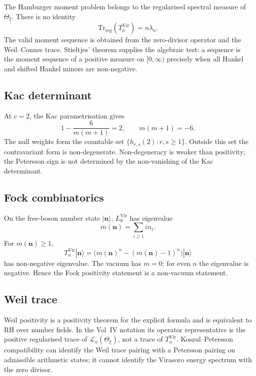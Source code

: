 The Hamburger moment problem belongs to the regularised spectral
measure of \(\Theta_{\xi}\). There is no identity
\[
\mathrm{Tr}_{\mathrm{reg}}(T_{n}^{\mathrm{Vir}})=n\lambda_{n}.
\]
The valid moment sequence is obtained from the zero-divisor operator and the
Weil--Connes trace. Stieltjes' theorem supplies the algebraic test:
a sequence is the moment sequence of a positive measure on
\([0,\infty)\) precisely when all Hankel and shifted Hankel minors are
non-negative.

\subsection{Kac determinant}
\label{v4-arith:vb:cycle:A3}

At \(c=2\), the Kac parametrisation gives
\[
1-\frac{6}{m(m+1)}=2,\qquad m(m+1)=-6.
\]
The null weights form the countable set
\(\{h_{r,s}(2):r,s\geq1\}\). Outside this set the contravariant form
is non-degenerate. Non-degeneracy is weaker than positivity; the
Petersson sign is not determined by the non-vanishing of the Kac
determinant.

\subsection{Fock combinatorics}
\label{v4-arith:vb:cycle:A4}

On the free-boson number state
\(|\mathbf n\rangle\), \(L_{0}^{\mathrm{Vir}}\) has eigenvalue
\[
m(\mathbf n)=\sum_{i\geq1}i n_i .
\]
For \(m(\mathbf n)\geq1\),
\[
T_{n}^{\mathrm{Vir}}|\mathbf n\rangle
=\bigl(m(\mathbf n)^n-(m(\mathbf n)-1)^n\bigr)|\mathbf n\rangle
\]
has non-negative eigenvalue. The vacuum has \(m=0\); for even \(n\)
the eigenvalue is negative. Hence the Fock positivity statement is a
non-vacuum statement.

\subsection{Weil trace}
\label{v4-arith:vb:cycle:A5}

Weil positivity is a positivity theorem for the explicit formula and
is equivalent to RH over number fields. In the Vol~IV notation its
operator representative is the positive regularised trace of
\(\mathcal L_n(\Theta_{\xi})\), not a trace of
\(T_n^{\mathrm{Vir}}\). Koszul--Petersson compatibility can identify
the Weil trace pairing with a Petersson pairing on admissible
arithmetic states; it cannot identify the Virasoro energy spectrum
with the zero divisor.

